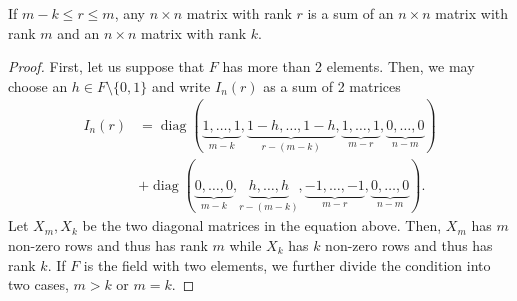 \documentclass[10pt,a4paper]{amsart}
\DeclareMathOperator{\diag}{diag}
\begin{document}
\begin{lem} \label{lem:r<m}
    If $m-k \leq r \leq m$, any $n \times n$ matrix with rank $r$ is a sum of an $n \times n$ matrix with rank $m$ and an $n \times n$ matrix with rank $k$.
\end{lem}

\begin{proof}
    First, let us suppose that $F$ has more than 2 elements. Then, we may choose an $h \in F \setminus\{0,1\}$ and write $I_n(r)$ as a sum of 2 matrices
    \begin{align*}
        I_n(r)
        &= \diag(\underbrace{1,\ldots,1}_{m-k},\underbrace{1-h,\ldots,1-h}_{r-(m-k)},\underbrace{1,\ldots,1}_{m-r},\underbrace{0,\ldots,0}_{n-m})\\
        &+ \diag(\underbrace{0,\ldots,0}_{m-k},\underbrace{h,\ldots,h}_{r-(m-k)},\underbrace{-1,\ldots,-1}_{m-r},\underbrace{0,\ldots,0}_{n-m}).
    \end{align*}
    Let $X_m, X_k$ be the two diagonal matrices in the equation above. Then, $X_m$ has $m$ non-zero rows and thus has rank $m$ while $X_k$ has $k$ non-zero rows and thus has rank $k$.
    If $F$ is the field with two elements, we further divide the condition into two cases, $m>k$ or $m=k$.

\end{proof}
\end{document}
